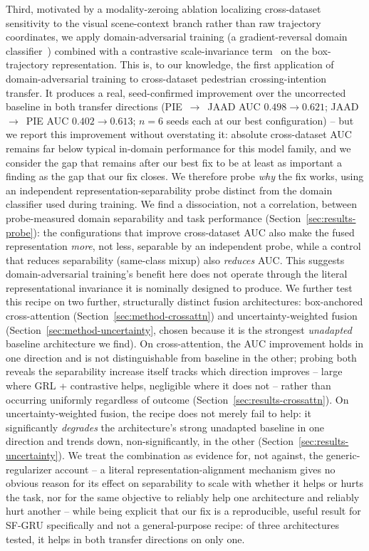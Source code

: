 Third, motivated by a modality-zeroing ablation localizing
cross-dataset sensitivity to the visual scene-context branch rather
than raw trajectory coordinates, we apply domain-adversarial training
(a gradient-reversal domain classifier~\cite{ganin2015dann}) combined
with a contrastive scale-invariance term~\cite{chen2020simclr} on the
box-trajectory representation. This is, to our knowledge, the first
application of domain-adversarial training to cross-dataset pedestrian
crossing-intention transfer. It produces a real, seed-confirmed
improvement over the uncorrected baseline in both transfer directions
(PIE~$\to$~JAAD AUC $0.498\to0.621$; JAAD~$\to$~PIE AUC
$0.402\to0.613$; $n=6$ seeds each at our best configuration) -- but we
report this improvement without overstating it: absolute cross-dataset
AUC remains far below typical in-domain performance for this model
family, and we consider the gap that remains after our best fix to be
at least as important a finding as the gap that our fix closes. We
therefore probe \emph{why} the fix works, using an independent
representation-separability probe distinct from the domain classifier
used during training. We find a dissociation, not a correlation,
between probe-measured domain separability and task performance
(Section~\ref{sec:results-probe}): the configurations that improve
cross-dataset AUC also make the fused representation \emph{more}, not
less, separable by an independent probe, while a control that reduces
separability (same-class mixup) also \emph{reduces} AUC. This suggests
domain-adversarial training's benefit here does not operate through the
literal representational invariance it is nominally designed to
produce. We further test this recipe on two further, structurally
distinct fusion architectures: box-anchored cross-attention
(Section~\ref{sec:method-crossattn}) and uncertainty-weighted fusion
(Section~\ref{sec:method-uncertainty}, chosen because it is the
strongest \emph{unadapted} baseline architecture we find). On
cross-attention, the AUC improvement holds in one direction and is not
distinguishable from baseline in the other; probing both reveals the
separability increase itself tracks which direction improves -- large
where GRL + contrastive helps, negligible where it does not -- rather
than occurring uniformly regardless of outcome
(Section~\ref{sec:results-crossattn}). On uncertainty-weighted fusion,
the recipe does not merely fail to help: it significantly
\emph{degrades} the architecture's strong unadapted baseline in one
direction and trends down, non-significantly, in the other
(Section~\ref{sec:results-uncertainty}). We treat the combination as
evidence for, not against, the generic-regularizer account -- a
literal representation-alignment mechanism gives no obvious reason for
its effect on separability to scale with whether it helps or hurts the
task, nor for the same objective to reliably help one architecture and
reliably hurt another -- while being explicit that our fix is a
reproducible, useful result for SF-GRU specifically and not a
general-purpose recipe: of three architectures tested, it helps in
both transfer directions on only one.


